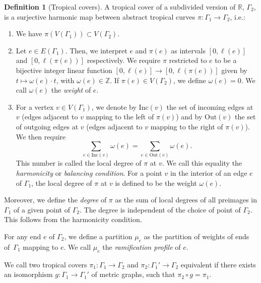\documentclass[11pt]{article}
\theoremstyle{definition}
\newtheorem{defi}[theo]{Definition}
\numberwithin{equation}{section}
\begin{document}
\begin{defi}[Tropical covers]
A tropical cover of a subdivided version of $\mathbb{R}$, $\Gamma_2$, is a surjective harmonic map between abstract tropical curves $\pi\colon \Gamma_1\to\Gamma_2$, i.e.:
\begin{enumerate}
    \item We have $\pi(V(\Gamma_1))\subset V(\Gamma_2)$.
    \item Let $e\in E(\Gamma_1)$. Then, we interpret $e$ and $\pi(e)$ as intervals $[0,\ell(e)]$ and $[0,\ell(\pi(e))]$ respectively. We require $\pi$ restricted to $e$ to be a bijective integer linear function $[0,\ell(e)]\to[0,\ell(\pi(e))]$ given by $t\mapsto \omega(e)\cdot t$, with $\omega(e) \in \mathbb{Z}$. If $\pi(e)\in V(\Gamma_2)$, we define $\omega(e)=0$. We call $\omega(e)$ the \textit{weight} of $e$.
    \item For a vertex $v\in V(\Gamma_1)$, we denote by $\mathrm{Inc}(v)$ the set of incoming edges at $v$ (edges adjacent to $v$ mapping to the left of $\pi(v)$) and by $\mathrm{Out}(v)$ the set of outgoing edges at $v$ (edges adjacent to $v$ mapping to the right of $\pi(v)$). We then require
    \begin{equation*}
            \sum_{e\in\mathrm{Inc}(v)}\omega(e)=\sum_{e\in\mathrm{Out}(v)}\omega(e).
    \end{equation*}
    This number is called the local degree of $\pi$ at $v$.
    We call this equality the \textit{harmonicity} or \textit{balancing condition}.
    For a point $v$ in the interior of an edge $e$ of $\Gamma_1$, the local degree of $\pi$ at $v$ is defined to be the weight $\omega(e)$.
\end{enumerate}
Moreover, we define the \textit{degree} of $\pi$ as the sum of local degrees of all preimages in $\Gamma_1$ of a given point of $\Gamma_2$. The degree is independent of the choice of point of $\Gamma_2$. This follows from the harmonicity condition.

For any end $e$ of $\Gamma_2$, we define a partition $\mu_e$ as the partition of weights of ends of~$\Gamma_1$ mapping to $e$. We call $\mu_e$ the \textit{ramification profile} of $e$.

We call two tropical covers $\pi_1\colon\Gamma_1\to\Gamma_2$ and $\pi_2\colon\Gamma_1'\to\Gamma_2$ equivalent if there exists an isomorphism $g\colon\Gamma_1\to\Gamma_1'$ of metric graphs, such that $\pi_2\circ g=\pi_1$.
\end{defi}
\end{document}
